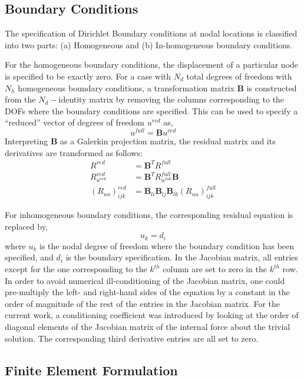 \documentclass[10pt]{article}
\begin{document}
\subsection{Boundary Conditions}
\label{sec:boundary-conditions}

The specification of Dirichlet Boundary conditions at nodal locations
is classified into two parts: (a) Homogeneous and (b) In-homogeneous
boundary conditions.

For the homogeneous boundary conditions, the displacement of a
particular node is specified to be exactly zero. For a case with $N_d$
total degrees of freedom with $N_h$ homogeneous boundary conditions, a
transformation matrix $\mathbf{B}$ is constructed from the
$N_d-$identity matrix by removing the columns corresponding to the
DOFs where the boundary conditions are specified. This can be used to
specify a ``reduced'' vector of degrees of freedom $u^{red}$ as,
$$ u^{full} = \mathbf{B}u^{red} $$
Interpreting $\mathbf{B}$ as a Galerkin projection matrix, the
residual matrix and its derivatives are transformed as follows:
\begin{align*}
  R^{red} &= \mathbf{B}^TR^{full}\\
  R^{red}_{u^{red}} &= \mathbf{B}^TR^{full}_{u^{full}}\mathbf{B}\\
  {\left(R_{uu}\right)}^{red}_{ijk} &= \mathbf{B}_{li} \mathbf{B}_{lj}
                                      \mathbf{B}_{lk}
                                      {\left(R_{uu}\right)}^{full}_{ijk}
\end{align*}

For inhomogeneous boundary conditions, the corresponding residual
equation is replaced by,
$$ u_k = d_i $$
where $u_k$ is the nodal degree of freedom where the boundary
condition has been specified, and $d_i$ is the boundary
specification. In the Jacobian matrix, all entries except for the one
corresponding to the $k^{th}$ column are set to zero in the $k^{th}$
row. In order to avoid numerical ill-conditioning of the Jacobian
matrix, one could pre-multiply the left- and right-hand sides of the
equation by a constant in the order of magnitude of the rest of the
entries in the Jacobian matrix. For the current work, a conditioning
coefficient was introduced by looking at the order of diagonal
elements of the Jacobian matrix of the internal force about the
trivial solution. The corresponding third derivative entries are all
set to zero.

\subsection{Finite Element Formulation}
\label{sec:finite-elem-form}
\end{document}
